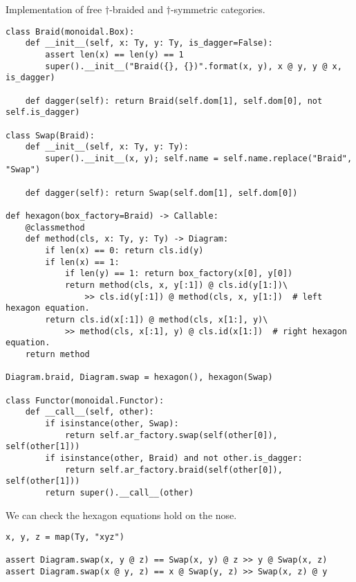 \begin{python}
{\normalfont Implementation of free $\dagger$-braided and $\dagger$-symmetric categories.}

\begin{verbatim}
class Braid(monoidal.Box):
    def __init__(self, x: Ty, y: Ty, is_dagger=False):
        assert len(x) == len(y) == 1
        super().__init__("Braid({}, {})".format(x, y), x @ y, y @ x, is_dagger)

    def dagger(self): return Braid(self.dom[1], self.dom[0], not self.is_dagger)

class Swap(Braid):
    def __init__(self, x: Ty, y: Ty):
        super().__init__(x, y); self.name = self.name.replace("Braid", "Swap")

    def dagger(self): return Swap(self.dom[1], self.dom[0])

def hexagon(box_factory=Braid) -> Callable:
    @classmethod
    def method(cls, x: Ty, y: Ty) -> Diagram:
        if len(x) == 0: return cls.id(y)
        if len(x) == 1:
            if len(y) == 1: return box_factory(x[0], y[0])
            return method(cls, x, y[:1]) @ cls.id(y[1:])\
                >> cls.id(y[:1]) @ method(cls, x, y[1:])  # left hexagon equation.
        return cls.id(x[:1]) @ method(cls, x[1:], y)\
            >> method(cls, x[:1], y) @ cls.id(x[1:])  # right hexagon equation.
    return method

Diagram.braid, Diagram.swap = hexagon(), hexagon(Swap)

class Functor(monoidal.Functor):
    def __call__(self, other):
        if isinstance(other, Swap):
            return self.ar_factory.swap(self(other[0]), self(other[1]))
        if isinstance(other, Braid) and not other.is_dagger:
            return self.ar_factory.braid(self(other[0]), self(other[1]))
        return super().__call__(other)
\end{verbatim}
\end{python}

\begin{example}
We can check the hexagon equations hold on the nose.

\begin{verbatim}
x, y, z = map(Ty, "xyz")

assert Diagram.swap(x, y @ z) == Swap(x, y) @ z >> y @ Swap(x, z)
assert Diagram.swap(x @ y, z) == x @ Swap(y, z) >> Swap(x, z) @ y
\end{verbatim}
\end{example}

